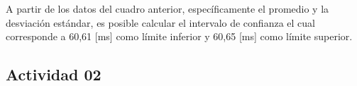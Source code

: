 \documentclass[10pt]{article}
\begin{document}
\begin{table}[H]
\centering
    \caption{hola}
\end{table}

\noindent
A partir de los datos del cuadro anterior, específicamente el promedio y la desviación estándar, es posible calcular el intervalo de confianza el cual corresponde a 60,61 [ms] como límite inferior y 60,65 [ms] como límite superior.

\subsection{Actividad 02}
\end{document}
